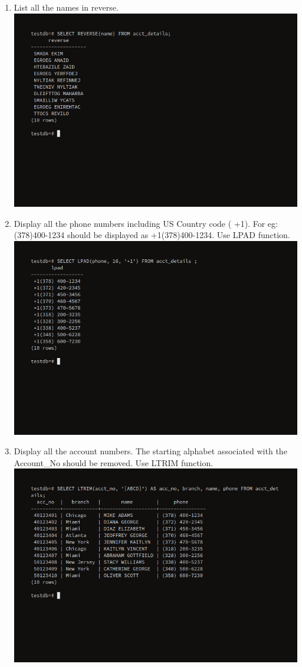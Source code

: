 \documentclass[10pt,a4paper,titlepage]{report}
\begin{document}
{\begin{enumerate}
	\item List all the names in reverse.\newline
	\includegraphics[width=\linewidth]{../Images/Strings/10.png}
	\item Display all the phone numbers including US Country code ( +1). For eg: (378)400-1234 should be displayed as +1(378)400-1234. Use LPAD function.\newline
	\includegraphics[width=\linewidth]{../Images/Strings/11.png}
	\item Display all the account numbers. The starting alphabet associated with the Account\_No should be removed. Use LTRIM function.\newline
	\includegraphics[width=\linewidth]{../Images/Strings/12.png}

\end{enumerate}}
\end{document}
